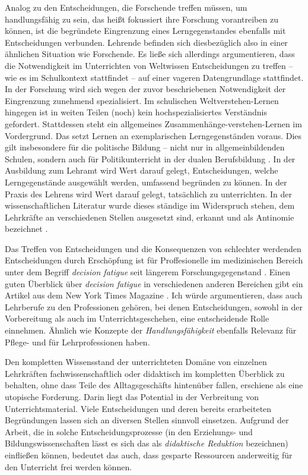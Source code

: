 Analog zu den Entscheidungen, die Forschende treffen müssen, um handlungsfähig zu sein, das heißt fokussiert ihre Forschung vorantreiben zu können, ist die begründete Eingrenzung eines Lerngegenstandes ebenfalls mit Entscheidungen verbunden. 
Lehrende befinden sich diesbezüglich also in einer ähnlichen Situation wie Forschende. 
Es ließe sich allerdings argumentieren, dass die Notwendigkeit im Unterrichten von Weltwissen Entscheidungen zu treffen -- wie es im Schulkontext stattfindet -- auf einer vageren Datengrundlage stattfindet. In der Forschung wird sich wegen der zuvor beschriebenen Notwendigkeit der Eingrenzung zunehmend spezialisiert. Im schulischen Weltverstehen-Lernen hingegen ist in weiten Teilen (noch) kein hochspezialisiertes Verständnis gefordert. Stattdessen steht ein allgemeines Zusammenhänge-verstehen-Lernen im Vordergrund. Das setzt Lernen an exemplarischen Lerngegenständen voraus. 
Dies gilt insbesondere für die politische Bildung -- nicht nur in allgemeinbildenden Schulen, sondern auch für Politikunterricht in der dualen Berufsbildung \autocite[vgl. \gls{abs} \ref{bplan}, \gls{S} \pageref{bplan} \&][4; 9-13]{bplan}.
In der Ausbildung zum Lehramt wird Wert darauf gelegt, Entscheidungen, welche Lerngegenstände ausgewählt werden, umfassend begründen zu können. 
In der Praxis des Lehrens wird Wert darauf gelegt, tatsächlich zu unterrichten.
In der wissenschaftlichen Literatur wurde dieses ständige im Widerspruch stehen, dem Lehrkräfte an verschiedenen Stellen ausgesetzt sind, erkannt und als Antinomie bezeichnet \autocite[\gls{vgl} \gls{zb}][]{Helsper.2001}. 

Das Treffen von Entscheidungen und die Konsequenzen von schlechter werdenden Entscheidungen durch Erschöpfung ist für Proffesionelle im medizinischen Bereich unter dem Begriff \emph{decision fatigue} seit längerem Forschungsgegenstand \autocite{Maier.2025}. Einen guten Überblick über \emph{decision fatigue} in verschiedenen anderen Bereichen gibt ein Artikel aus dem New York Times Magazine \autocite{Tierny.08.08.2011}. 
Ich würde argumentieren, dass auch Lehrberufe zu den Professionen gehören, bei denen Entscheidungen, sowohl in der Vorbereitung als auch im Unterrichtsgeschehen, eine entscheidende Rolle einnehmen. %
Ähnlich wie Konzepte der \emph{Handlungsfähigkeit} ebenfalls Relevanz für Pflege- und für Lehrprofessionen haben. 

Den kompletten Wissensstand der unterrichteten Domäne von einzelnen Lehrkräften fachwissenschaftlich oder didaktisch im kompletten Überblick zu behalten, ohne dass Teile des Alltagsgeschäfts hintenüber fallen, erschiene als eine utopische Forderung. Darin liegt das Potential in der Verbreitung von Unterrichtsmaterial. Viele Entscheidungen und deren bereits erarbeiteten Begründungen lassen sich an diversen Stellen sinnvoll einsetzen. Aufgrund der Arbeit, die in solche Entscheidungsprozesse (in den Erziehungs- und Bildungswissenschaften lässt es sich das als \emph{didaktische Reduktion} bezeichnen) einfließen können, bedeutet das auch, dass gesparte Ressourcen anderweitig für den Unterricht frei werden können. 

